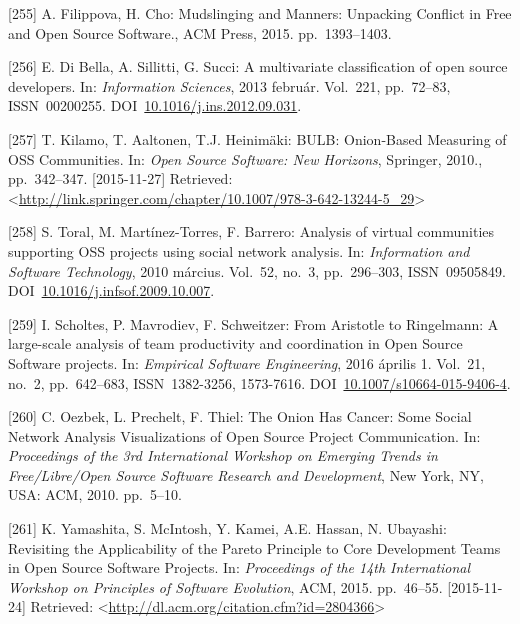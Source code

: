 \documentclass[12pt,magyar,a4paper,oneside]{scrreprt}
\begin{document}
\leavevmode\hypertarget{ref-filippova_mudslinging_2015}{}%
{[}255{]} A. Filippova, H. Cho: Mudslinging and Manners: Unpacking
Conflict in Free and Open Source Software., ACM Press, 2015.
pp.~1393--1403.

\leavevmode\hypertarget{ref-di_bella_multivariate_2013}{}%
{[}256{]} E. Di Bella, A. Sillitti, G. Succi: A multivariate
classification of open source developers. In: \emph{Information
Sciences}, 2013 február. Vol.~221, pp.~72--83, ISSN~00200255.
DOI~\href{https://doi.org/10.1016/j.ins.2012.09.031}{10.1016/j.ins.2012.09.031}.

\leavevmode\hypertarget{ref-kilamo_bulb_2010}{}%
{[}257{]} T. Kilamo, T. Aaltonen, T.J. Heinimäki: BULB: Onion-Based
Measuring of OSS Communities. In: \emph{Open Source Software: New
Horizons}, Springer, 2010., pp.~342--347. {[}2015-11-27{]} Retrieved:
\textless{}\url{http://link.springer.com/chapter/10.1007/978-3-642-13244-5_29}\textgreater{}

\leavevmode\hypertarget{ref-toral_analysis_2010}{}%
{[}258{]} S. Toral, M. Martínez-Torres, F. Barrero: Analysis of virtual
communities supporting OSS projects using social network analysis. In:
\emph{Information and Software Technology}, 2010 március. Vol.~52,
no.~3, pp.~296--303, ISSN~09505849.
DOI~\href{https://doi.org/10.1016/j.infsof.2009.10.007}{10.1016/j.infsof.2009.10.007}.

\leavevmode\hypertarget{ref-scholtes_aristotle_2016}{}%
{[}259{]} I. Scholtes, P. Mavrodiev, F. Schweitzer: From Aristotle to
Ringelmann: A large-scale analysis of team productivity and coordination
in Open Source Software projects. In: \emph{Empirical Software
Engineering}, 2016 április 1. Vol.~21, no.~2, pp.~642--683,
ISSN~1382-3256, 1573-7616.
DOI~\href{https://doi.org/10.1007/s10664-015-9406-4}{10.1007/s10664-015-9406-4}.

\leavevmode\hypertarget{ref-oezbek_onion_2010}{}%
{[}260{]} C. Oezbek, L. Prechelt, F. Thiel: The Onion Has Cancer: Some
Social Network Analysis Visualizations of Open Source Project
Communication. In: \emph{Proceedings of the 3rd International Workshop
on Emerging Trends in Free/Libre/Open Source Software Research and
Development}, New York, NY, USA: ACM, 2010. pp.~5--10.

\leavevmode\hypertarget{ref-yamashita_revisiting_2015}{}%
{[}261{]} K. Yamashita, S. McIntosh, Y. Kamei, A.E. Hassan, N. Ubayashi:
Revisiting the Applicability of the Pareto Principle to Core Development
Teams in Open Source Software Projects. In: \emph{Proceedings of the
14th International Workshop on Principles of Software Evolution}, ACM,
2015. pp.~46--55. {[}2015-11-24{]} Retrieved:
\textless{}\url{http://dl.acm.org/citation.cfm?id=2804366}\textgreater{}
\end{document}
